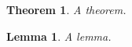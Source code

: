 \documentclass{amsart}
\newtheorem{theorem}{Theorem}
\newtheorem{lemma}{Lemma}
\begin{document}
\begin{theorem}
A theorem.
\end{theorem}
\begin{lemma}
A lemma.
\end{lemma}
\end{document}
